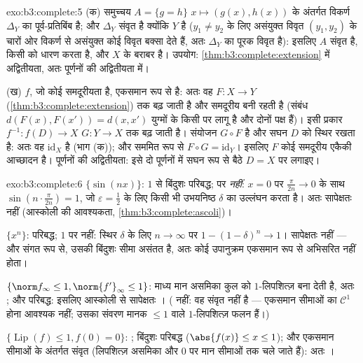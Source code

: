 \begin{solution}{exo:b3:complete:5}
(क) समुच्चय $A = \{g = h\}$  $x \mapsto (g(x), h(x))$ के अंतर्गत विकर्ण $\Delta_Y$ का पूर्व-प्रतिबिंब
है; और $\Delta_Y$ संवृत है क्योंकि $Y$  है ($y_1 \neq y_2$ के लिए
असंयुक्त विवृत  $(y_1,
y_2)$ के चारों ओर विकर्ण से असंयुक्त कोई
विवृत बक्सा देते हैं, अतः $\Delta_Y$ का पूरक विवृत है): इसलिए $A$ संवृत
है, किसी  को धारण करता है, और $X$ के बराबर है। उपयोग:
\cref{thm:b3:complete:extension} में अद्वितीयता, अतः पूर्णनों की अद्वितीयता में।

(ख) $f$, जो कोई समदूरीयता है, एकसमान रूप से  है: अतः वह $F\colon X \to Y$
(\cref{thm:b3:complete:extension}) तक बढ़ जाती है और समदूरीय बनी रहती है (संबंध $d(F(x), F(x')) = d(x, x')$ युग्मों
के किसी  पर लागू है और दोनों पक्ष  हैं)। इसी प्रकार
$f^{-1}\colon f(D) \to X$ $G \colon Y \to X$ तक बढ़ जाती है। संयोजन $G \circ F$  है और सघन $D$ को
स्थिर रखता है: अतः वह $\mathrm{id}_X$ है (भाग (क)); और सममित रूप से $F \circ G =
\mathrm{id}_Y$।
इसलिए $F$ कोई समदूरीय एकैकी आच्छादन है। पूर्णनों की अद्वितीयता:
इसे दो पूर्णनों में सघन रूप से बैठे $D = X$ पर लगाइए।
\end{solution}

\begin{solution}{exo:b3:complete:6}
$\{\sin(nx)\}$: $1$ से बिंदुशः परिबद्ध; पर  \emph{नहीं}: $x = 0$ पर
$\frac\pi{2n} \to 0$ के साथ $\sin(n\cdot\frac{\pi}{2n}) = 1$, जो $\varepsilon = \frac12$ के लिए किसी भी उभयनिष्ठ $\delta$ का उल्लंघन
करता है। अतः सापेक्षतः  नहीं (आस्कोली की आवश्यकता, \cref{thm:b3:complete:ascoli})।

$\{x^n\}$: परिबद्ध; $1$ पर  नहीं: स्थिर $\delta$ के लिए $n \to \infty$ पर
$1 - (1 -
\delta)^n \to 1$। सापेक्षतः  नहीं --- और संगत रूप से, उसकी बिंदुशः सीमा
असंतत है, अतः कोई उपानुक्रम एकसमान रूप से अभिसरित नहीं होता।

$\{\norm f_\infty \leq 1, \norm{f'}_\infty \leq 1\}$: माध्य मान असमिका कुल को $1$-लिपशित्ज़ बना देती है, अतः
; और परिबद्ध: इसलिए आस्कोली से सापेक्षतः । ( नहीं:
वह संवृत नहीं है --- एकसमान सीमाओं का $\mathcal C^1$ होना आवश्यक नहीं; उसका
संवरण मानक $\leq 1$ वाले $1$-लिपशित्ज़ फलन हैं।)

$\{\operatorname{Lip}(f) \leq 1, f(0) = 0\}$: ; बिंदुशः परिबद्ध ($\abs{f(x)} \leq x \leq 1$); और एकसमान सीमाओं के अंतर्गत
संवृत (लिपशित्ज़ असमिका और $0$ पर मान सीमाओं तक चले जाते हैं): अतः
।
\end{solution}

